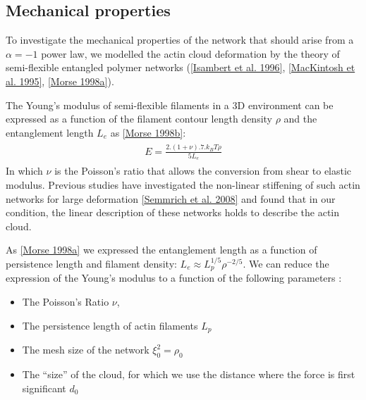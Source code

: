 \documentclass[A4paperpaper,11pt,english]{sphinxmanual}
\begin{document}
\subsection{Mechanical properties}
\label{index-latex:mechanical-properties}
To investigate the mechanical properties of the network that should arise from
a \(\alpha = -1\) power law, we modelled the actin cloud deformation by
the theory of semi-flexible entangled polymer networks ({\hyperref[index-latex:isambert1996]{{[}Isambert et al. 1996{]}}},
{\hyperref[index-latex:mackintosh1995]{{[}MacKintosh et al. 1995{]}}}, {\hyperref[index-latex:morse1998a]{{[}Morse  1998a{]}}}).

The Young's modulus of semi-flexible filaments in a 3D environment can be
expressed as a function of the filament contour length density \(\rho\) and the
entanglement length \(L_e\) as {\hyperref[index-latex:morse1998b]{{[}Morse  1998b{]}}}:
\label{index-latex:equation-eqa37}\begin{gather}
\begin{split}E= \frac{2.(1+\nu).7.k_BT \rho}{5L_e}\end{split}\label{index-latex-eqa37}
\end{gather}
In which \(\nu\) is the Poisson’s ratio that allows the conversion from shear to
elastic modulus. Previous studies have investigated the non-linear stiffening of
such actin networks for large deformation {\hyperref[index-latex:semmrich2008]{{[}Semmrich et al. 2008{]}}} and found that in
our condition, the linear description of these networks holds to describe the
actin cloud.

As {\hyperref[index-latex:morse1998a]{{[}Morse  1998a{]}}} we expressed the entanglement length as a
function of persistence length and filament density: \(L_e\approx L_p^{1/5} \rho^{-2/5}\). We can
reduce the expression of the Young's modulus to a function of the following
parameters :
\begin{itemize}
\item {} 
The Poisson’s Ratio \(\nu\),

\item {} 
The persistence length of actin filaments \(L_p\)

\item {} 
The mesh size of the network \(\xi_0^2 = \rho_0\)

\item {} 
The ``size'' of the cloud, for which we use the distance where the force
is first significant \(d_0\)

\end{itemize}
\end{document}
